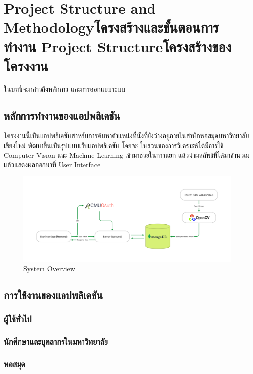 \chapter{\ifproject%
\ifenglish Project Structure and Methodology\else โครงสร้างและขั้นตอนการทำงาน\fi
\else%
\ifenglish Project Structure\else โครงสร้างของโครงงาน\fi
\fi
}

ในบทนี้จะกล่าวถึงหลักการ และการออกแบบระบบ

\section{หลักการทำงานของแอปพลิเคชัน}
โครงงานนี้เป็นแอปพลิเคชันสำหรับการค้นหาตำแหน่งที่นั่งที่ยังว่างอยู่ภายในสำนักหอสมุดมหาวิทยาลัยเชียงใหม่ พัฒนาขึ้นเป็นรูปแบบเว็บแอปพลิเคชัน
โดยจะ ในส่วนของการวิเคราะห์ได้มีการใช้ Computer Vision และ Machine Learning เข้ามาช่วยในการแยก แล้วนำผลลัพธ์ที่ได้มาคำนวณ แล้วแสดงผลออกมาที่ User Interface
\begin{figure}[h]
\centering
\includegraphics[width=\textwidth]{System Diagram.jpg}
\caption[System Overview]{System Overview}
\label{fig:System}
\end{figure}

\section{การใช้งานของแอปพลิเคชัน}
\subsection{ผู้ใช้ทั่วไป}
\subsection{นักศึกษาและบุคลากรในมหาวิทยาลัย}
\subsection{หอสมุด}